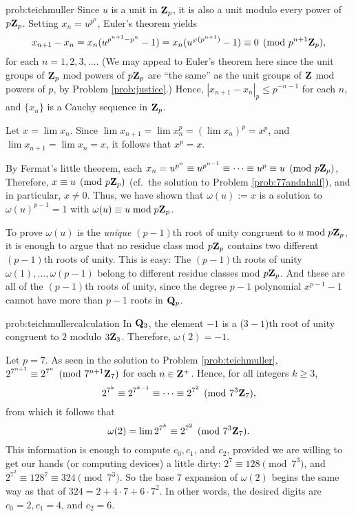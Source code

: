 \begin{sol}{prob:teichmuller} 
 Since $u$ is a unit in $\mathbf{Z}_p$, it is also a unit modulo every power of $p\mathbf{Z}_p$. Setting $x_n = u^{p^n}$, Euler's theorem yields
\[ x_{n+1} - x_n = x_ n(u^{p^{n+1}-p^n} - 1) = x_n (u^{\varphi(p^{n+1})}-1) \equiv 0 \pmod{p^{n+1}\mathbf{Z}_p}, \]
for each $n=1,2,3,\dots$. (We may appeal to Euler's theorem here since the unit groups of $\mathbf{Z}_p$ mod powers of $p\mathbf{Z}_p$ are ``the same'' as the unit groups of $\mathbf{Z}$ mod powers of $p$, by Problem \ref{prob:justice}.) Hence, $|x_{n+1}-x_n|_p \le p^{-n-1}$ for each $n$, and $\{x_n\}$ is a Cauchy sequence in $\mathbf{Z}_p$.

Let $x = \lim x_n$. Since $\lim x_{n+1} = \lim x_n^{p} = (\lim x_n)^p = x^p$, and $\lim x_{n+1} = \lim x_n = x$, it follows that $x^p=x$.

By Fermat's little theorem, each $x_n = u^{p^n} \equiv u^{p^{n-1}} \equiv \dots \equiv u^p \equiv u\pmod{p\mathbf{Z}_p}$, Therefore, $x\equiv u\pmod{p\mathbf{Z}_p}$ (cf.\ the solution to Problem \ref{prob:77andahalf}), and in particular, $x\ne 0$. Thus, we have shown that $\omega(u):= x$ is a solution to $\omega(u)^{p-1}=1$ with $\omega(u)\equiv u\bmod{p\mathbf{Z}_{p}}$.

To prove $\omega(u)$ is the \emph{unique} $(p-1)$th root of unity congruent to $u\bmod{p\mathbf{Z}_p}$, it is enough to argue that no residue class mod $p\mathbf{Z}_p$ contains two different $(p-1)$th roots of unity. This is easy: The $(p-1)$th roots of unity $\omega(1), \dots, \omega(p-1)$ belong to different residue classes mod $p\mathbf{Z}_{p}$. And these are  all of the $(p-1)$th roots of unity, since the degree $p-1$ polynomial $x^{p-1}-1$ cannot have more than $p-1$ roots in $\mathbf{Q}_p$.
\end{sol}


\begin{sol}{prob:teichmullercalculation} In $\mathbf{Q}_3$, the element $-1$ is a ($3-1$)th root of unity congruent to $2$ modulo $3\mathbf{Z}_3$. Therefore, $\omega(2) = -1$.

Let $p=7$. As seen in the solution to Problem \ref{prob:teichmuller}, $2^{7^{n+1}} \equiv 2^{7^n} \pmod{7^{n+1} \mathbf{Z}_7}$ for each $n \in \mathbf{Z}^{+}$. Hence, for all integers $k\ge 3$,
\[ 2^{7^k} \equiv 2^{7^{k-1}} \equiv \dots \equiv 2^{7^2} \pmod{7^{3}\mathbf{Z}_7}, \]
from which it follows that 
\[ \omega(2)= \lim 2^{7^k}\equiv 2^{7^2}\pmod{7^3\mathbf{Z}_7}. \]
This information is enough to compute $c_0, c_1$, and $c_2$, provided we are willing to get our hands (or computing devices) a little dirty: $2^7 \equiv 128 \pmod{7^3}$, and $2^{7^2} \equiv 128^7 \equiv 324 \pmod{7^3}$. So the base $7$ expansion of $\omega(2)$ begins the same way as that of $324 = 2 + 4\cdot 7 + 6\cdot 7^2$. In other words, the desired digits are $c_0=2, c_1 = 4$, and $c_2 = 6$.
\end{sol}

